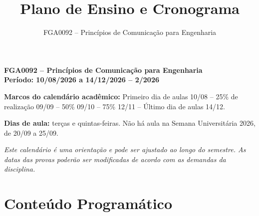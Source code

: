 \documentclass[11pt,a4paper]{article}
\title{\textbf{Plano de Ensino e Cronograma}}
\author{FGA0092 -- Princípios de Comunicação para Engenharia}
\date{}
\begin{document}
\thispagestyle{plain}
\maketitle
\vspace{-1.2em}

\begin{center}
\textbf{FGA0092 -- Princípios de Comunicação para Engenharia} \\
\textbf{Período: 10/08/2026 a 14/12/2026 -- 2\textordmasculine/2026}
\end{center}
\vspace{0.5em}

\noindent\textbf{Marcos do calendário acadêmico:} Primeiro dia de aulas 10/08 -- 25\% de realização 09/09 -- 50\% 09/10 -- 75\% 12/11 -- Último dia de aulas 14/12.
\vspace{0.5em}

\noindent\textbf{Dias de aula:} terças e quintas-feiras. Não há aula na Semana Universitária 2026, de 20/09 a 25/09.
\vspace{0.5em}

\noindent\textit{Este calendário é uma orientação e pode ser ajustado ao longo do semestre. As datas das provas poderão ser modificadas de acordo com as demandas da disciplina.}
\vspace{1em}

\section{Conteúdo Programático}
\end{document}
